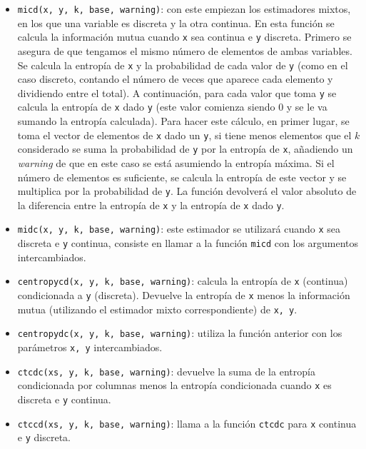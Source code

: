 \documentclass[12pt,a4paper]{report} %
\theoremstyle{definition}
\begin{document}
\begin{itemize}
\item \texttt{micd(x, y, k, base, warning)}: con este empiezan los estimadores mixtos, en los que una variable es discreta y la otra continua. En esta función se calcula la información mutua cuando \texttt{x} sea continua e \texttt{y} discreta. Primero se asegura de que tengamos el mismo número de elementos de ambas variables. Se calcula la entropía de \texttt{x} y la probabilidad de cada valor de \texttt{y} (como en el caso discreto, contando el número de veces que aparece cada elemento y dividiendo entre el total). A continuación, para cada valor que toma \texttt{y} se calcula la entropía de \texttt{x} dado \texttt{y} (este valor comienza siendo $0$ y se le va sumando la entropía calculada). Para hacer este cálculo, en primer lugar, se toma el vector de elementos de \texttt{x} dado un \texttt{y}, si tiene menos elementos que el $k$ considerado se suma la probabilidad de \texttt{y} por la entropía de \texttt{x}, añadiendo un \textit{warning} de que en este caso se está asumiendo la entropía máxima. Si el número de elementos es suficiente, se calcula la entropía de este vector y se multiplica por la probabilidad de \texttt{y}. La función devolverá el valor absoluto de la diferencia entre la entropía de \texttt{x} y la entropía de \texttt{x} dado \texttt{y}.

\item \texttt{midc(x, y, k, base, warning)}: este estimador se utilizará cuando \texttt{x} sea discreta e \texttt{y} continua, consiste en llamar a la función \texttt{micd} con los argumentos intercambiados.

\item \texttt{centropycd(x, y, k, base, warning)}: calcula la entropía de \texttt{x} (continua) condicionada a \texttt{y} (discreta). Devuelve la entropía de \texttt{x} menos la información mutua (utilizando el estimador mixto correspondiente) de \texttt{x, y}.

\item \texttt{centropydc(x, y, k, base, warning)}: utiliza la función anterior con los parámetros \texttt{x, y} intercambiados.

\item \texttt{ctcdc(xs, y, k, base, warning)}: devuelve la suma de la entropía condicionada por columnas menos la entropía condicionada cuando \texttt{x} es discreta e \texttt{y} continua.

\item \texttt{ctccd(xs, y, k, base, warning)}: llama a la función \texttt{ctcdc} para \texttt{x} continua e \texttt{y} discreta.


\end{itemize}
\end{document}
